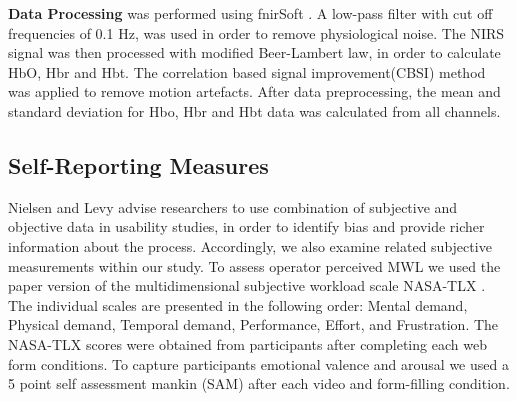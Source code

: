 \documentclass[../main/Feedback.tex]{subfiles}
\begin{document}
\textbf{Data Processing} was performed using fnirSoft \cite{ayazfunctional}. 
A low-pass filter with cut off frequencies of 0.1 Hz, was used in order to remove physiological noise.
The NIRS signal was then processed with modified Beer-Lambert law\cite{cope1988system}, in order to calculate HbO, Hbr and Hbt.  
The correlation based signal improvement(CBSI) \cite{cui2010functional} method was applied to remove motion artefacts.
After data preprocessing, the mean and standard deviation for Hbo, Hbr and Hbt data was calculated from all channels.


\subsection{Self-Reporting Measures}
Nielsen and Levy \cite{nielsen1994measuring} advise researchers to use combination of subjective and objective data in usability studies, in order to identify bias and provide richer information about the process. Accordingly, we also examine related subjective measurements within our study. To assess operator perceived MWL we used the paper version of the multidimensional subjective workload scale NASA-TLX \cite{nasatlx}.
The individual scales are presented in the following order: Mental demand, Physical demand, Temporal demand, Performance, Effort, and Frustration.
The NASA-TLX scores were obtained from participants after completing each web form conditions. To capture participants emotional valence and arousal we used a 5 point self assessment mankin (SAM)\cite{bradley1994measuring} after each video and form-filling condition.  
\end{document}
